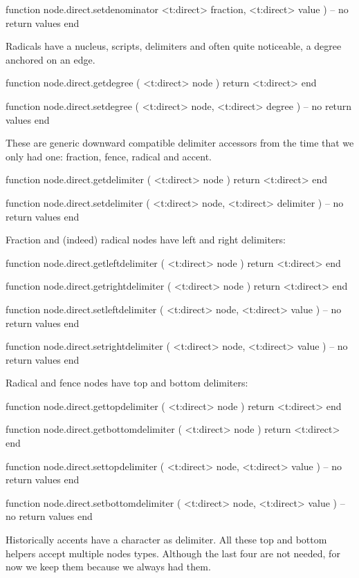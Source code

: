 function node.direct.setdenominator
    <t:direct> fraction,
    <t:direct> value
)
    -- no return values
end
\stoptyping

Radicals have a nucleus, scripts, delimiters and often quite noticeable, a degree anchored
on an edge.

\starttyping[option=LUA]
function node.direct.getdegree ( <t:direct> node )
    return <t:direct>
end

function node.direct.setdegree ( <t:direct> node, <t:direct> degree )
    -- no return values
end
\stoptyping

These are generic downward compatible delimiter accessors from the time that we
only had one: fraction, fence, radical and accent.

\starttyping[option=LUA]
function node.direct.getdelimiter ( <t:direct> node )
    return <t:direct>
end

function node.direct.setdelimiter ( <t:direct> node, <t:direct> delimiter )
    -- no return values
end
\stoptyping

Fraction and (indeed) radical nodes have left and right delimiters:

\starttyping[option=LUA]
function node.direct.getleftdelimiter ( <t:direct> node )
    return <t:direct>
end

function node.direct.getrightdelimiter ( <t:direct> node )
    return <t:direct>
end

function node.direct.setleftdelimiter (
    <t:direct> node,
    <t:direct> value
)
    -- no return values
end

function node.direct.setrightdelimiter (
    <t:direct> node,
    <t:direct> value
)
    -- no return values
end
\stoptyping

Radical and fence nodes have top and bottom delimiters:

\starttyping[option=LUA]
function node.direct.gettopdelimiter ( <t:direct> node )
    return <t:direct>
end

function node.direct.getbottomdelimiter ( <t:direct> node )
    return <t:direct>
end

function node.direct.settopdelimiter (
    <t:direct> node,
    <t:direct> value
)
    -- no return values
end

function node.direct.setbottomdelimiter (
    <t:direct> node,
    <t:direct> value
)
    -- no return values
end
\stoptyping

Historically accents have a character as delimiter. All these top and bottom
helpers accept multiple nodes types. Although the last four are not needed, for
now we keep them because we always had them.

